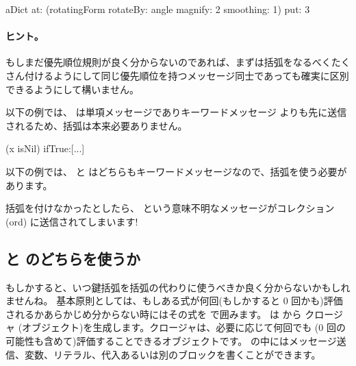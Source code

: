 \documentclass[a4paper,10pt,twoside]{book}
\begin{document}
\begin{code}{}
aDict
   at: (rotatingForm 
          rotateBy: angle	
          magnify: 2 
          smoothing: 1)
   put: 3
\end{code}



\paragraph{ヒント。} もしまだ優先順位規則が良く分からないのであれば、まずは括弧をなるべくたくさん付けるようにして同じ優先順位を持つメッセージ同士であっても確実に区別できるようにして構いません。

以下の例では、 は単項メッセージでありキーワードメッセージ  よりも先に送信されるため、括弧は本来必要ありません。
\begin{code}{}
(x isNil)
   ifTrue:[...]
\end{code}

以下の例では、 と  はどちらもキーワードメッセージなので、括弧を使う必要があります。
\noindent
括弧を付けなかったとしたら、 という意味不明なメッセージがコレクション (ord) に送信されてしまいます!

\subsection{\lct{[ ]} と \lct{( )} のどちらを使うか}
もしかすると、いつ鍵括弧を括弧の代わりに使うべきか良く分からないかもしれませんね。
基本原則としては、もしある式が何回(もしかすると 0 回かも)評価されるかあらかじめ分からない時にはその式を \ct{[ ]} で囲みます。
 は  から クロージャ (\ie オブジェクト)を生成します。クロージャは、必要に応じて何回でも (0 回の可能性も含めて)評価することできるオブジェクトです。\ct{[ ]} の中にはメッセージ送信、変数、リテラル、代入あるいは別のブロックを書くことができます。
\end{document}

